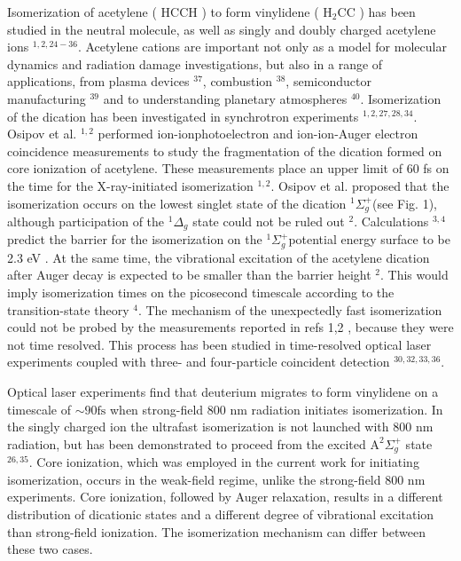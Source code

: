 \documentclass[10pt]{article}
\begin{document}
Isomerization of acetylene ( HCCH ) to form vinylidene ( $\mathrm{H}_{2} \mathrm{CC}$ ) has been studied in the neutral molecule, as well as singly and doubly charged acetylene ions ${ }^{1,2,24-36}$. Acetylene cations are important not only as a model for molecular dynamics and radiation damage investigations, but also in a range of applications, from plasma devices ${ }^{37}$, combustion ${ }^{38}$, semiconductor manufacturing ${ }^{39}$ and to understanding planetary atmospheres ${ }^{40}$. Isomerization of the dication has been investigated in synchrotron experiments ${ }^{1,2,27,28,34}$. Osipov et al. ${ }^{1,2}$ performed ion-ionphotoelectron and ion-ion-Auger electron coincidence measurements to study the fragmentation of the dication formed on core ionization of acetylene. These measurements place an upper limit of 60 fs on the time for the X-ray-initiated isomerization ${ }^{1,2}$. Osipov et al. proposed that the isomerization occurs on the lowest singlet state of the dication ${ }^{1} \Sigma_{g}^{+}$(see Fig. 1), although participation of the ${ }^{1} \Delta_{g}$ state could not be ruled out ${ }^{2}$. Calculations ${ }^{3,4}$ predict the barrier for the isomerization on the ${ }^{1} \Sigma_{g}^{+}$potential energy surface to be 2.3 eV . At the same time, the vibrational excitation of the acetylene dication after Auger decay is expected to be smaller than the barrier height ${ }^{2}$. This would imply isomerization times on the picosecond timescale according to the transition-state theory ${ }^{4}$. The mechanism of the unexpectedly fast isomerization could not be probed by the measurements reported in refs 1,2 , because they were not time resolved. This process has been studied in time-resolved optical laser experiments coupled with three- and four-particle coincident detection ${ }^{30,32,33,36}$.

Optical laser experiments find that deuterium migrates to form vinylidene on a timescale of $\sim 90 \mathrm{fs}$ when strong-field 800 nm radiation initiates isomerization. In the singly charged ion the ultrafast isomerization is not launched with 800 nm radiation, but has been demonstrated to proceed from the excited $\mathrm{A}^{2} \Sigma_{g}^{+}$ state ${ }^{26,35}$. Core ionization, which was employed in the current work for initiating isomerization, occurs in the weak-field regime, unlike the strong-field 800 nm experiments. Core ionization, followed by Auger relaxation, results in a different distribution of dicationic states and a different degree of vibrational excitation than strong-field ionization. The isomerization mechanism can differ between these two cases.
\end{document}
